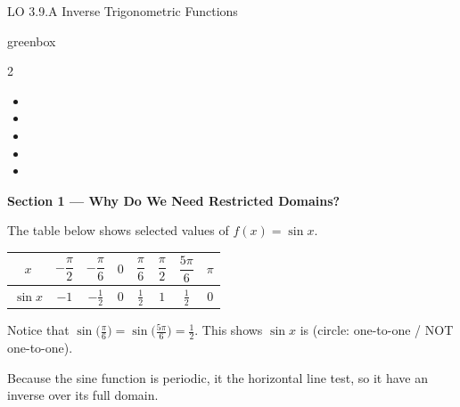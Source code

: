 \documentclass[10pt]{article}
\begin{document}
\namedateperiod

\vspace{0.10in}

\begin{notesbox}{LO 3.9.A \; Inverse Trigonometric Functions}

\begin{skillbox}{greenbox}
\begin{multicols}{2}
\begin{itemize}[leftmargin=1.4em, itemsep=1pt]
    \item {}
    \item {}
    \item {}
    \item {}
    \item {}
\end{itemize}
\end{multicols}
\end{skillbox}

\vspace{0.08in}

\textbf{Section 1 --- Why Do We Need Restricted Domains?}

The table below shows selected values of $f(x) = \sin x$.

\begin{center}
\renewcommand{\arraystretch}{1.8}
\begin{tabular}{|c|c|c|c|c|c|c|c|}
\hline
$x$ &
$-\dfrac{\pi}{2}$ & $-\dfrac{\pi}{6}$ & $0$ &
$\dfrac{\pi}{6}$ & $\dfrac{\pi}{2}$ & $\dfrac{5\pi}{6}$ & $\pi$ \\
\hline
$\sin x$ & $-1$ & $-\tfrac{1}{2}$ & $0$ &
$\tfrac{1}{2}$ & $1$ & $\tfrac{1}{2}$ & $0$ \\
\hline
\end{tabular}
\end{center}

Notice that $\sin\!\bigl(\tfrac{\pi}{6}\bigr) = \sin\!\bigl(\tfrac{5\pi}{6}\bigr) = \tfrac{1}{2}$.
This shows $\sin x$ is \blank{3cm} (circle: one-to-one \;/\; NOT one-to-one).

\medskip
Because the sine function is periodic, it \blank{5.5cm} the horizontal line
test, so it \blank{4cm} have an inverse over its full domain.


\end{notesbox}
\end{document}
